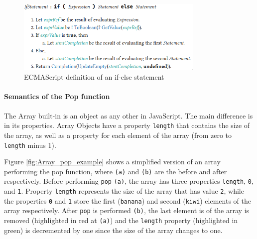 \documentclass[runningheads]{llncs}
\begin{document}
\begin{figure}[ht]
    \centering
    \includegraphics[width=0.8\textwidth]{images/if_statement.png}
    \caption{ECMAScript definition of an if-else statement}
    \label{fig:If-Else_Statement}
\end{figure}

\paragraph{Semantics of the Pop function}
The Array built-in is an object as any other in JavaScript. The main difference is in its properties. Array Objects have a property \texttt{length} that contains the size of the array, as well as a property for each element of the array (from zero to \texttt{length} minus 1).

Figure \ref{fig:Array_pop_example} shows a simplified version of an array performing the pop function, where \texttt{(a)} and \texttt{(b)} are the before and after respectively.
Before performing \texttt{pop} \texttt{(a)}, the array has three  properties \texttt{length}, \texttt{0}, and \texttt{1}. Property \texttt{length} represents the size of the array that has value \texttt{2}, while the properties \texttt{0} and \texttt{1} store the first (\texttt{banana}) and second (\texttt{kiwi}) elements of the array respectively.
After \texttt{pop} is performed \texttt{(b)}, the last element is of the array is removed (highlighted in red at \texttt{(a)}) and the \texttt{length} property (highlighted in green) is decremented by one since the size of the array changes to one.
\end{document}
